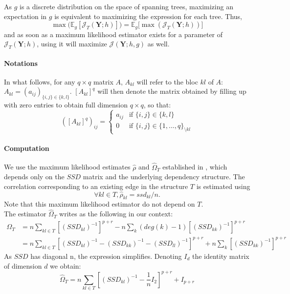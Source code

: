 \documentclass[11pt,a4paper]{article}
\newcommand{\Ybf}{\boldsymbol{Y}}
\newcommand{\Esp}{\mathds{E}}
\begin{document}
As $g$ is a discrete distribution on the space of spanning trees, maximizing an expectation in $g$ is equivalent to maximizing the expression for each tree. Thus,
$$ \max\big(\Esp_g[\mathcal{J}_T(\Ybf;h)]\big) = \Esp_g\big[\max(\mathcal{J}_T(\Ybf;h))\big]$$
and as soon as a maximum likelihood estimator exists for a parameter of $\mathcal{J}_T(\Ybf;h)$, using it will maximize $\mathcal{J}(\Ybf;h,g)$ as well. 


 \paragraph{Notations\\}
In what follows, for any $q\times q$  matrix $A$, $A_{kl}$ will refer to the bloc $kl$ of $A$: $A_{kl}=(a_{ij})_{\{i,j\}\in\{k,l\}}$.   $[A_{kl}]^q$ will then denote the matrix obtained by filling up with zero entries to obtain full dimension $q\times q$, so that:
$$([A_{kl}]^q )_{ij}=\left\{ \begin{array}{rl}
a_{ij} & \text{if } \{i,j\}\in\{k,l\}\\
0 &  \text{if } \{i,j\}\in\{1,..., q\}_{\setminus kl}
\end{array}\right.$$


\paragraph{Computation\\}
 We use the maximum likelihood estimates $\hat{\rho}$ and $\hat{\Omega}_T$ established in \citet{Lau96}, which depends only on the $SSD$ matrix and the underlying dependency structure.
  The correlation corresponding to an existing edge in the structure $T$ is estimated using
  $$ \forall kl\in T,\boxed{\hat{\rho}_{kl} = ssd_{kl}/n}.$$
  Note that this maximum likelihood estimator do not depend on $T$.\\
  
   The estimator  $\hat{\Omega}_T$  writes as the following in our context:
\begin{align*}
\widehat{\Omega}_T &= n  \sum_{kl\in T}   [(SSD_{kl})^{-1}]^{p+r} - n\sum_k (deg(k)-1)[(SSD_{kk})^{-1}]^{p+r}\\
&=n \sum_{kl\in T}  [(SSD_{kl})^{-1} - (SSD_{kk})^{-1} -  (SSD_{ll})^{-1} ]^{p+r} + n\sum_k[(SSD_{kk})^{-1}]^{p+r}
\end{align*}
As $SSD$ has diagonal n, the expression simplifies. Denoting $I_d$ the identity matrix of dimension $d$ we obtain:
$$\widehat{\Omega}_T =n\sum_{kl\in T} [(SSD_{kl})^{-1} -\frac{1}{n} I_2]^{p+r}+ I_{p+r}$$
\end{document}
